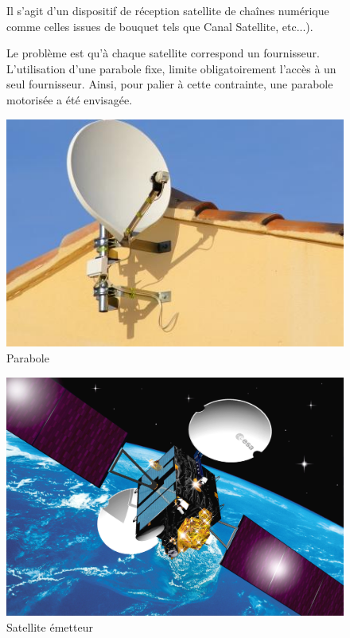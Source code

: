 \begin{figure}[htbp]
\begin{minipage}[c]{.65\linewidth}
Il s'agit d'un dispositif de réception satellite de chaînes numérique comme celles issues de \og bouquet \fg tels que Canal Satellite, etc...). 

Le problème est qu'à chaque satellite correspond un fournisseur. L'utilisation d'une parabole fixe, limite obligatoirement l'accès à un seul fournisseur. Ainsi, pour palier à cette contrainte, une parabole motorisée a été envisagée.
\end{minipage}
\hfill
\begin{minipage}[c]{.30\linewidth}
\begin{center}
\includegraphics[width=\linewidth]{img/parabole.jpg}
\caption{Parabole}
\label{fig:parabole1}
\end{center}
\end{minipage}
\end{figure}

\begin{figure}[htbp]
\begin{center}
\includegraphics[width=0.6\linewidth]{img/satellite.jpg}
\caption{Satellite émetteur}
\label{fig:parabole2}
\end{center}
\end{figure}

